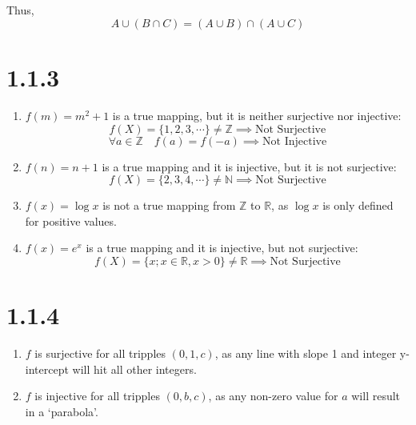 \documentclass[12pt]{article}
\def\firstcircle{(90:.75cm) circle (1cm)}
\def\secondcircle{(210:.75cm) circle (1cm)}
\def\thirdcircle{(330:.75cm) circle (1cm)}
\begin{document}
\hfill
{}
\\ \\
Thus, \[ A \cup \left(B \cap C\right) = \left(A \cup B\right) \cap \left(A \cup C\right) \]


\section*{1.1.3}
\begin{enumerate}[label=(\alph*)]
    \item $f(m) = m^2 + 1$ is a true mapping, but it is neither surjective nor injective:
    \[ f(X) = \{1, 2, 3, \cdots\} \neq \mathbb{Z} \implies \text{Not Surjective} \]
    \[ \forall a \in \mathbb{Z} \quad f(a) = f(-a) \implies \text{Not Injective} \]
    \item $f(n) = n + 1$ is a true mapping and it is injective, but it is not surjective:
    \[ f(X) = \{2, 3, 4, \cdots\} \neq \mathbb{N} \implies \text{Not Surjective} \]
    \item $f(x) = \log x$ is not a true mapping from $\mathbb{Z}$ to $\mathbb{R}$, as $\log x$ is only defined for positive values.
    \item $f(x) = e^x$ is a true mapping and it is injective, but not surjective:
    \[ f(X) = \{x; x\in\mathbb{R}, x>0\} \neq \mathbb{R} \implies \text{Not Surjective} \]
\end{enumerate}


\section*{1.1.4}
\begin{enumerate}[label=(\alph*)]
    \item $f$ is surjective for all tripples $(0, 1, c)$, as any line with slope 1 and integer y-intercept will hit all other integers.
    \item $f$ is injective for all tripples $(0, b, c)$, as any non-zero value for $a$ will result in a `parabola'.
\end{enumerate}
\end{document}
